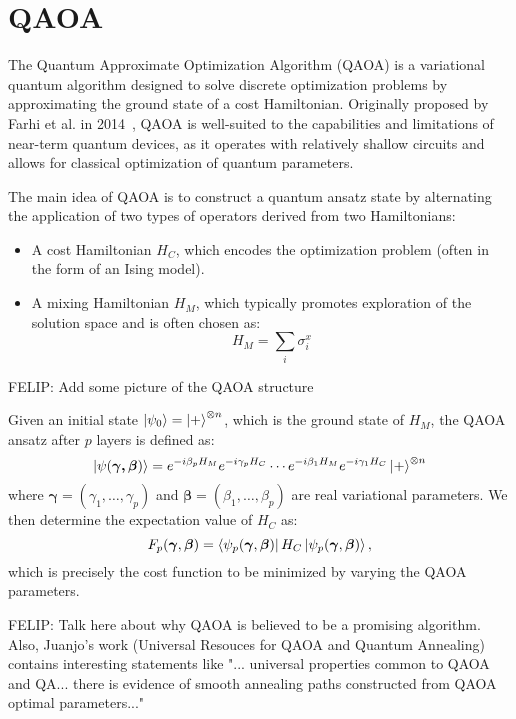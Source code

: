 \section{QAOA}
\label{Section:QAOA}

The Quantum Approximate Optimization Algorithm (QAOA) is a variational quantum algorithm
designed to solve discrete optimization problems by approximating the ground state of a cost Hamiltonian.
Originally proposed by Farhi et al. in 2014~\cite{farhi_quantum_2014}, QAOA is well-suited to the capabilities
and limitations of near-term quantum devices, as it operates with relatively shallow circuits
and allows for classical optimization of quantum parameters.

The main idea of QAOA is to construct a quantum ansatz state by alternating the application of
two types of operators derived from two Hamiltonians:
\begin{itemize}
    \item A cost Hamiltonian $H_C$, which encodes the optimization problem (often
    in the form of an Ising model).
    \item A mixing Hamiltonian $H_M$, which typically promotes exploration of the solution
    space and is often chosen as:
    \begin{equation}
        H_M = \sum_i \sigma_i^x
        \label{eq:mixing_hamiltonian}
    \end{equation}
\end{itemize}

{\color{red} FELIP: Add some picture of the QAOA structure}

Given an initial state $\ket{\psi_0} = \ket{+}^{\otimes n}$, which is the ground state of
$H_M$, the QAOA ansatz after $p$ layers is defined as:
\begin{equation}
    \ket{\psi(\bm{\gamma, \beta})} = e^{-i \beta_p H_M} e^{- i \gamma_p H_C} \cdots
    e^{-i \beta_1 H_M} e^{- i \gamma_1 H_C} \ket{+}^{\otimes n}
\end{equation}
where $\bm{\gamma} = (\gamma_1, \dots, \gamma_p)$ and $\bm{\beta} = (\beta_1, \dots, \beta_p)$
are real variational parameters. We then determine the expectation value of $H_C$ as:
\begin{equation}
    F_p (\bm{\gamma}, \bm{\beta}) = \bra{\psi_p (\bm{\gamma}, \bm{\beta})} H_C \ket{\psi_p (\bm{\gamma}, \bm{\beta})},
    \label{eq:cost_function}
\end{equation}
which is precisely the cost function to be minimized by varying the QAOA parameters.

{\color{red} FELIP: Talk here about why QAOA is believed to be a promising algorithm. Also,
Juanjo's work (Universal Resouces for QAOA and Quantum Annealing) contains interesting
statements like "... universal properties common to QAOA and QA... there is evidence
of smooth annealing paths constructed from QAOA optimal parameters..."}